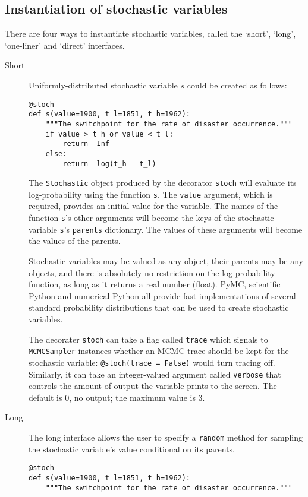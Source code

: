 \subsection{Instantiation of stochastic variables}
There are four ways to instantiate stochastic variables, called the `short', `long', `one-liner' and `direct' interfaces.
\begin{description}    
    \item[Short] Uniformly-distributed stochastic variable $s$ could be created as follows:
    \begin{verbatim}
@stoch
def s(value=1900, t_l=1851, t_h=1962):
    """The switchpoint for the rate of disaster occurrence."""
    if value > t_h or value < t_l:
        return -Inf
    else:
        return -log(t_h - t_l) 
    \end{verbatim}
    The \texttt{Stochastic} object produced by the decorator \texttt{stoch} will evaluate its log-probability using the function \texttt{s}. The \texttt{value} argument, which is required, provides an initial value for the variable. The names of the function \texttt{s}'s other arguments will become the keys of the stochastic variable \texttt{s}'s \texttt{parents} dictionary. The values of these arguments will become the values of the parents.

Stochastic variables may be valued as any object, their parents may be any objects, and there is absolutely no restriction on the log-probability function, as long as it returns a real number (float). PyMC, scientific Python and numerical Python all provide fast implementations of several standard probability distributions that can be used to create stochastic variables.

    The decorater \texttt{stoch} can take a flag called \texttt{trace} which signals to \texttt{MCMCSampler} instances whether an MCMC trace should be kept for the stochastic variable: \texttt{@stoch(trace = False)} would turn tracing off. Similarly, it can take an integer-valued argument called \texttt{verbose} that controls the amount of output the variable prints to the screen. The default is $0$, no output; the maximum value is 3.

    \item[Long] The long interface allows the user to specify a \texttt{random} method for sampling the stochastic variable's value conditional on its parents.
    \begin{verbatim}
@stoch
def s(value=1900, t_l=1851, t_h=1962):
    """The switchpoint for the rate of disaster occurrence."""


\end{verbatim}
\end{description}
